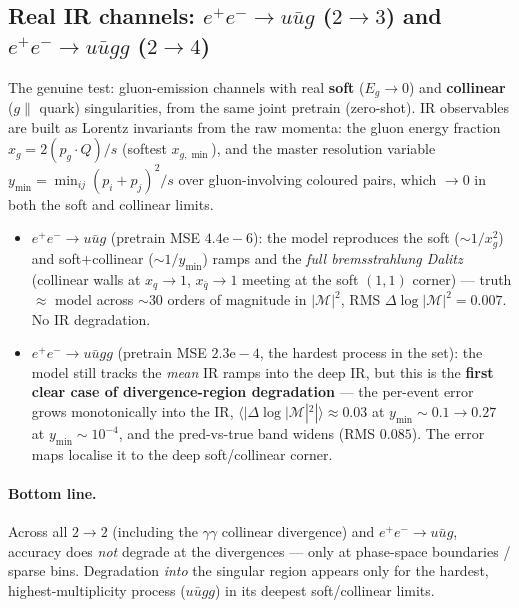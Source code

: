 \subsection{Real IR channels: $e^+e^-\to u\bar u g$ ($2\to3$) and
            $e^+e^-\to u\bar u gg$ ($2\to4$)}

The genuine test: gluon-emission channels with real \textbf{soft} ($E_g\to0$) and
\textbf{collinear} ($g\parallel$ quark) singularities, from the same joint pretrain
(zero-shot).  IR observables are built as Lorentz invariants from the raw momenta:
the gluon energy fraction $x_g = 2(p_g\!\cdot\!Q)/s$ (softest $x_{g,\min}$), and the
master resolution variable $y_{\min}=\min_{ij}(p_i+p_j)^2/s$ over gluon-involving
coloured pairs, which $\to0$ in both the soft and collinear limits.

\begin{itemize}
  \item \textbf{$e^+e^-\to u\bar u g$} (pretrain MSE $4.4\mathrm{e}{-}6$): the model
    reproduces the soft ($\sim1/x_g^2$) and soft$+$collinear ($\sim1/y_{\min}$) ramps
    and the \emph{full bremsstrahlung Dalitz} (collinear walls at $x_q\to1$,
    $x_{\bar q}\to1$ meeting at the soft $(1,1)$ corner) --- truth $\approx$ model
    across $\sim\!30$ orders of magnitude in $|\mathcal{M}|^2$, RMS
    $\Delta\log|\mathcal{M}|^2 = 0.007$.  No IR degradation.
  \item \textbf{$e^+e^-\to u\bar u gg$} (pretrain MSE $2.3\mathrm{e}{-}4$, the hardest
    process in the set): the model still tracks the \emph{mean} IR ramps into the deep
    IR, but this is the \textbf{first clear case of divergence-region degradation} ---
    the per-event error grows monotonically into the IR, $\langle
    |\Delta\log|\mathcal{M}|^2|\rangle \approx 0.03$ at $y_{\min}\!\sim\!0.1
    \to 0.27$ at $y_{\min}\!\sim\!10^{-4}$, and the pred-vs-true band widens (RMS
    $0.085$).  The error maps localise it to the deep soft/collinear corner.
\end{itemize}

\paragraph{Bottom line.}  Across all $2\to2$ (including the $\gamma\gamma$ collinear
divergence) and $e^+e^-\to u\bar u g$, accuracy does \emph{not} degrade at the
divergences --- only at phase-space boundaries / sparse bins.  Degradation
\emph{into} the singular region appears only for the hardest, highest-multiplicity
process ($u\bar u gg$) in its deepest soft/collinear limits.


